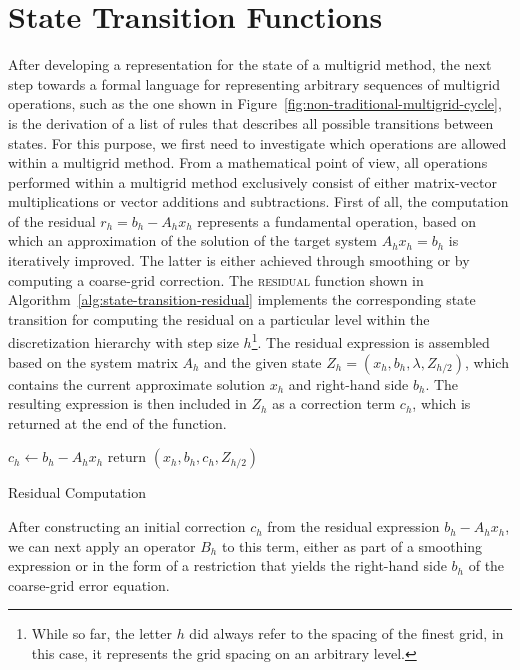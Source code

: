 \section{State Transition Functions}
\label{sec:multigrid-state-transitions}
After developing a representation for the state of a multigrid method, the next step towards a formal language for representing arbitrary sequences of multigrid operations,
such as the one shown in Figure~\ref{fig:non-traditional-multigrid-cycle}, is the derivation of a list of rules that describes all possible transitions between states.
For this purpose, we first need to investigate which operations are allowed within a multigrid method.
From a mathematical point of view, all operations performed within a multigrid method exclusively consist of either matrix-vector multiplications or vector additions and subtractions.
First of all, the computation of the residual $r_h = b_h - A_h x_h$ represents a fundamental operation, based on which an approximation of the solution of the target system $A_h x_h = b_h$ is iteratively improved.
The latter is either achieved through smoothing or by computing a coarse-grid correction.
The \textsc{residual} function shown in Algorithm~\ref{alg:state-transition-residual} implements the corresponding state transition for computing the residual on a particular level within the discretization hierarchy with step size $h$\footnote{While so far, the letter $h$ did always refer to the spacing of the finest grid, in this case, it represents the grid spacing on an arbitrary level.}.
The residual expression is assembled based on the system matrix $A_h$ and the given state $Z_h = (x_h, b_h, \lambda, Z_{h/2})$, which contains the current approximate solution $x_h$ and right-hand side $b_h$.
The resulting expression is then included in $Z_h$ as a correction term $c_h$, which is returned at the end of the function.
\begin{algorithm}[t]
	\begin{algorithmic}
		\State $c_h \gets b_h - A_h x_h$
		\State return $(x_h, b_h, c_h, Z_{h/2})$
		\EndFunction
	\end{algorithmic}
\caption{Residual Computation}
\label{alg:state-transition-residual}
\end{algorithm}
After constructing an initial correction $c_h$ from the residual expression $b_h - A_h x_h$, we can next apply an operator $B_h$ to this term, either as part of a smoothing expression or in the form of a restriction that yields the right-hand side $b_h$ of the coarse-grid error equation.
